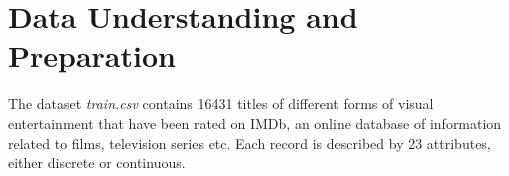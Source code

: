 \chapter{Data Understanding and Preparation}
\label{ch:capitolo1}

The dataset \textit{train.csv} contains 16431 titles of different forms of visual entertainment that have been rated on IMDb, 
an online database of information related to films, television series etc. 
Each record is described by 23 attributes, either discrete or continuous. 



